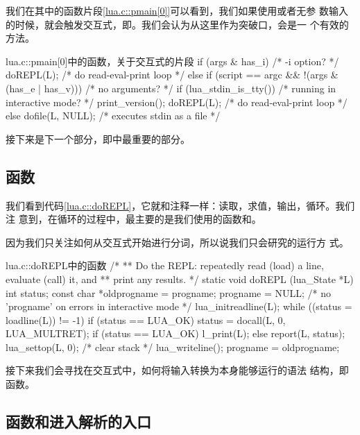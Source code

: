 我们在其中的函数片段\ref{lua.c::pmain[0]}可以看到，我们如果使用或者无参
数输入的时候，就会触发交互式，即。我们会认为从这里作为突破口，会是一
个有效的方法。

\begin{ccode}{lua.c::pmain[0]}{中的函数，关于交互式的片段}
  if (args & has_i)  /* -i option? */
    doREPL(L);  /* do read-eval-print loop */
  else if (script == argc && !(args & (has_e | has_v))) {  /* no arguments? */
    if (lua_stdin_is_tty()) {  /* running in interactive mode? */
      print_version();
      doREPL(L);  /* do read-eval-print loop */
    }
    else dofile(L, NULL);  /* executes stdin as a file */
  }
\end{ccode}

接下来是下一个部分，即中最重要的部分。


\subsection{函数}

我们看到代码\ref{lua.c::doREPL}，它就和注释一样：读取，求值，输出，循环。我们注
意到，在循环的过程中，最主要的是我们使用的函数和。

因为我们只关注如何从交互式开始进行分词，所以说我们只会研究的运行方
式。

\begin{ccode}{lua.c::doREPL}{中的函数}
/*
** Do the REPL: repeatedly read (load) a line, evaluate (call) it, and
** print any results.
*/
static void doREPL (lua_State *L) {
  int status;
  const char *oldprogname = progname;
  progname = NULL;  /* no 'progname' on errors in interactive mode */
  lua_initreadline(L);
  while ((status = loadline(L)) != -1) {
    if (status == LUA_OK)
      status = docall(L, 0, LUA_MULTRET);
    if (status == LUA_OK) l_print(L);
    else report(L, status);
  }
  lua_settop(L, 0);  /* clear stack */
  lua_writeline();
  progname = oldprogname;
}
\end{ccode}

接下来我们会寻找在交互式中，如何将输入转换为本身能够运行的语法
结构，即函数。


\subsection{函数和进入解析的入口}

